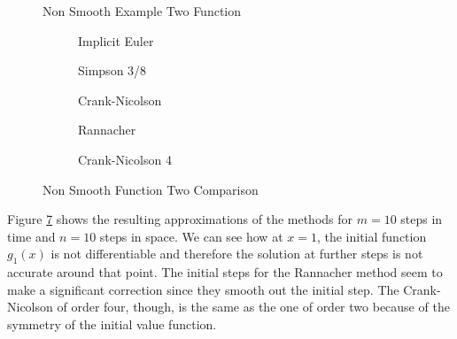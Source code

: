 \documentclass[00main.tex]{subfiles}
\begin{document}
\begin{figure}
\centering
{}
\caption{Non Smooth Example Two Function}
\label{nonsmooth1}
\end{figure}


\begin{figure}
\centering
\begin{subfigure}[b]{0.3\textwidth}
\resizebox{1\textwidth}{!}{
}
\caption{Implicit Euler}
\label{euler01}
\end{subfigure}%
\begin{subfigure}[b]{0.3\textwidth}
\resizebox{1\textwidth}{!}{
}
\caption{Simpson 3/8}
\label{fig:tiger}
\end{subfigure}
\begin{subfigure}[b]{0.3\textwidth}
\resizebox{1\textwidth}{!}{
}
\caption{Crank-Nicolson}
\label{fig:mouse}
\end{subfigure}
\begin{subfigure}[b]{0.3\textwidth}
\resizebox{1\textwidth}{!}{
}
\caption{\centering Rannacher}
\label{fig:mouse}
\end{subfigure}
\begin{subfigure}[b]{0.3\textwidth}
\resizebox{1\textwidth}{!}{
}
\caption{\centering Crank-Nicolson 4}
\label{fig:mouse}
\end{subfigure}
\caption{Non Smooth Function Two Comparison}
\label{nonsmooth12}
\end{figure}


Figure \ref{nonsmooth12} shows the resulting approximations of the methods for $m= 10$ steps in time and $n=10$ steps in space. We can see how at $x=1$, the initial function $g_1(x)$ is not differentiable and therefore the solution at further steps is not accurate around that point. %
The initial steps for the Rannacher method seem to make a significant correction since they smooth out the initial step. The Crank-Nicolson of order four, though, is the same as the one of order two because of the symmetry of the initial value function.
\end{document}
